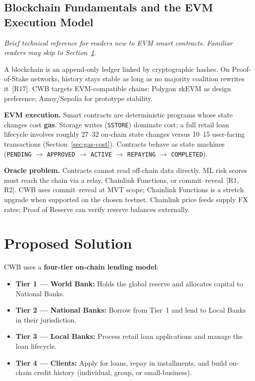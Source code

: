 \documentclass[12pt,a4paper]{report}
\begin{document}
\subsection{Blockchain Fundamentals and the EVM Execution Model}
\label{sec:blockchain-fundamentals}

\noindent\textit{\small Brief technical reference for readers new to EVM smart contracts. Familiar readers may skip to Section~\ref{sec:proposed-solution}.}

A blockchain is an append-only ledger linked by cryptographic hashes. On Proof-of-Stake networks, history stays stable as long as no majority coalition rewrites it~[R17]. CWB targets EVM-compatible chains: Polygon zkEVM as design preference; Amoy/Sepolia for prototype stability.

\textbf{EVM execution.} Smart contracts are deterministic programs whose state changes cost \textbf{gas}. Storage writes (\texttt{SSTORE}) dominate cost; a full retail loan lifecycle involves roughly 27--32 on-chain state changes versus 10--15 user-facing transactions (Section~\ref{sec:gas-cost}). Contracts behave as state machines (\texttt{PENDING} $\to$ \texttt{APPROVED} $\to$ \texttt{ACTIVE} $\to$ \texttt{REPAYING} $\to$ \texttt{COMPLETED}).

\textbf{Oracle problem.} Contracts cannot read off-chain data directly. ML risk scores must reach the chain via a relay, Chainlink Functions, or commit--reveal~[R1, R2]. CWB uses commit--reveal at MVT scope; Chainlink Functions is a stretch upgrade when supported on the chosen testnet. Chainlink price feeds supply FX rates; Proof of Reserve can verify reserve balances externally.

\section{Proposed Solution}
\label{sec:proposed-solution}

CWB uses a \textbf{four-tier on-chain lending model}:

\begin{itemize}[noitemsep]
\item \textbf{Tier 1 --- World Bank:} Holds the global reserve and allocates capital to National Banks.
\item \textbf{Tier 2 --- National Banks:} Borrow from Tier~1 and lend to Local Banks in their jurisdiction.
\item \textbf{Tier 3 --- Local Banks:} Process retail loan applications and manage the loan lifecycle.
\item \textbf{Tier 4 --- Clients:} Apply for loans, repay in installments, and build on-chain credit history (individual, group, or small-business).
\end{itemize}
\end{document}
